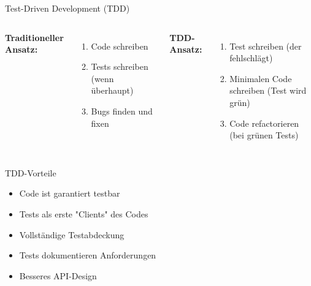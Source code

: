 \begin{frame}{Test-Driven Development (TDD)}
  \begin{columns}[T]
    \textbf{Traditioneller Ansatz:}
    \begin{enumerate}
      \item Code schreiben
      \item Tests schreiben (wenn überhaupt)
      \item Bugs finden und fixen
    \end{enumerate}

    \textbf{TDD-Ansatz:}
    \begin{enumerate}
      \item Test schreiben (der fehlschlägt)
      \item Minimalen Code schreiben (Test wird grün)
      \item Code refactorieren (bei grünen Tests)
    \end{enumerate}
  \end{columns}

  \begin{exampleblock}{TDD-Vorteile}
    \begin{itemize}
      \item Code ist garantiert testbar
      \item Tests als erste "Clients" des Codes
      \item Vollständige Testabdeckung
      \item Tests dokumentieren Anforderungen
      \item Besseres API-Design
    \end{itemize}
  \end{exampleblock}
\end{frame}

